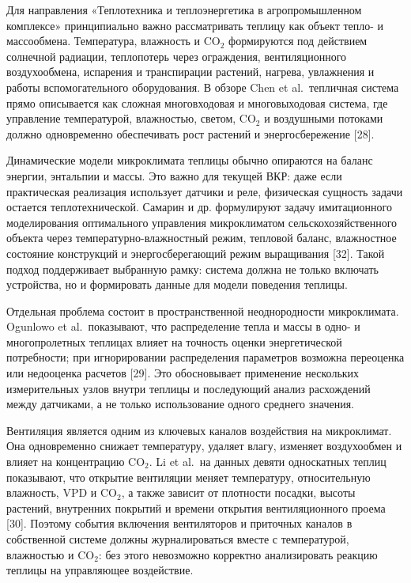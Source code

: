 \documentclass[a4paper,14pt]{extarticle}
\begin{document}
Для направления «Теплотехника и теплоэнергетика в агропромышленном
комплексе» принципиально важно рассматривать теплицу как объект тепло- и
массообмена. Температура, влажность и CO\(_2\) формируются под действием
солнечной радиации, теплопотерь через ограждения, вентиляционного
воздухообмена, испарения и транспирации растений, нагрева, увлажнения и
работы вспомогательного оборудования. В обзоре Chen et al.~тепличная
система прямо описывается как сложная многовходовая и многовыходовая
система, где управление температурой, влажностью, светом, CO\(_2\) и
воздушными потоками должно одновременно обеспечивать рост растений и
энергосбережение {[}28{]}.

Динамические модели микроклимата теплицы обычно опираются на баланс
энергии, энтальпии и массы. Это важно для текущей ВКР: даже если
практическая реализация использует датчики и реле, физическая сущность
задачи остается теплотехнической. Самарин и др. формулируют задачу
имитационного моделирования оптимального управления микроклиматом
сельскохозяйственного объекта через температурно-влажностный режим,
тепловой баланс, влажностное состояние конструкций и энергосберегающий
режим выращивания {[}32{]}. Такой подход поддерживает выбранную рамку:
система должна не только включать устройства, но и формировать данные
для модели поведения теплицы.

Отдельная проблема состоит в пространственной неоднородности
микроклимата. Ogunlowo et al.~показывают, что распределение тепла и
массы в одно- и многопролетных теплицах влияет на точность оценки
энергетической потребности; при игнорировании распределения параметров
возможна переоценка или недооценка расчетов {[}29{]}. Это обосновывает
применение нескольких измерительных узлов внутри теплицы и последующий
анализ расхождений между датчиками, а не только использование одного
среднего значения.

Вентиляция является одним из ключевых каналов воздействия на
микроклимат. Она одновременно снижает температуру, удаляет влагу,
изменяет воздухообмен и влияет на концентрацию CO\(_2\). Li et al.~на
данных девяти односкатных теплиц показывают, что открытие вентиляции
меняет температуру, относительную влажность, VPD и CO\(_2\), а также
зависит от плотности посадки, высоты растений, внутренних покрытий и
времени открытия вентиляционного проема {[}30{]}. Поэтому события
включения вентиляторов и приточных каналов в собственной системе должны
журналироваться вместе с температурой, влажностью и CO\(_2\): без этого
невозможно корректно анализировать реакцию теплицы на управляющее
воздействие.
\end{document}
